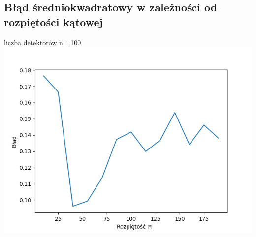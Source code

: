\documentclass{article}
\begin{document}
\subsection{Błąd średniokwadratowy w zależności od rozpiętości kątowej}
liczba detektorów n =100
\includegraphics[width=\textwidth]{wykres3}
\centering
 
\end{document}
